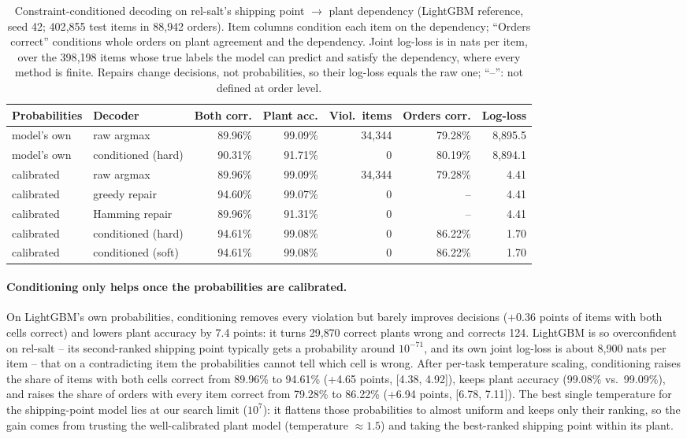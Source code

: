 \documentclass[11pt]{article}
\begin{document}
\begin{table}[h]
\centering
\small
\caption{Constraint-conditioned decoding on rel-salt's shipping point $\to$ plant dependency
(LightGBM reference, seed 42; 402{,}855 test items in 88{,}942 orders). Item columns condition
each item on the dependency; ``Orders correct'' conditions whole orders on plant agreement and
the dependency. Joint log-loss is in nats per item, over the 398{,}198 items whose true labels
the model can predict and satisfy the dependency, where every method is finite. Repairs change
decisions, not probabilities, so their log-loss equals the raw one; ``--'': not defined at order
level.}
\label{tab:ccd}
\begin{tabular}{@{} l l r r r r r @{}}
\toprule
\textbf{Probabilities} & \textbf{Decoder} & \textbf{Both corr.} & \textbf{Plant acc.} & \textbf{Viol.\ items} & \textbf{Orders corr.} & \textbf{Log-loss} \\
\midrule
model's own & raw argmax & 89.96\% & 99.09\% & 34{,}344 & 79.28\% & 8{,}895.5 \\
model's own & conditioned (hard) & 90.31\% & 91.71\% & 0 & 80.19\% & 8{,}894.1 \\
\midrule
calibrated & raw argmax & 89.96\% & 99.09\% & 34{,}344 & 79.28\% & 4.41 \\
calibrated & greedy repair & 94.60\% & 99.07\% & 0 & -- & 4.41 \\
calibrated & Hamming repair & 89.96\% & 91.31\% & 0 & -- & 4.41 \\
calibrated & conditioned (hard) & 94.61\% & 99.08\% & 0 & 86.22\% & 1.70 \\
calibrated & conditioned (soft) & 94.61\% & 99.08\% & 0 & 86.22\% & 1.70 \\
\bottomrule
\end{tabular}
\end{table}

\paragraph{Conditioning only helps once the probabilities are calibrated.} On LightGBM's own
probabilities, conditioning removes every violation but barely improves decisions (+0.36 points
of items with both cells correct) and lowers plant accuracy by 7.4 points: it turns 29{,}870
correct plants wrong and corrects 124. LightGBM is so overconfident on rel-salt -- its
second-ranked shipping point typically gets a probability around $10^{-71}$, and its own joint
log-loss is about 8{,}900 nats per item -- that on a contradicting item the probabilities cannot
tell which cell is wrong. After per-task temperature scaling, conditioning raises the share of
items with both cells correct from 89.96\% to 94.61\% (+4.65 points, [4.38, 4.92]), keeps plant
accuracy (99.08\% vs.\ 99.09\%), and raises the share of orders with every item correct from
79.28\% to 86.22\% (+6.94 points, [6.78, 7.11]). The best single temperature for the
shipping-point model lies at our search limit ($10^7$): it flattens those probabilities to almost
uniform and keeps only their ranking, so the gain comes from trusting the well-calibrated plant
model (temperature $\approx 1.5$) and taking the best-ranked shipping point within its plant.
\end{document}
